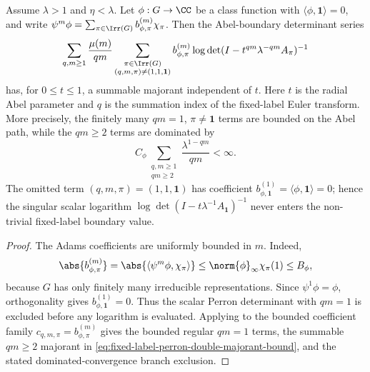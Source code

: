 \begin{lemma}
  \label{lem:fixed-label-perron-double-majorant}
  Assume \(\lambda>1\) and \(\eta<\lambda\). Let
  \(\phi:G\to\CC\) be a class function with
  \(\langle\phi,\mathbf1\rangle=0\), and write
  \(\psi^m\phi=\sum_{\pi\in\Irr(G)}b_{\phi,\pi}^{(m)}\chi_\pi\).
  Then the Abel-boundary determinant series
  \begin{equation}\label{eq:fixed-label-perron-double-majorant-series}
    \sum_{q,m\ge1}\frac{\mu(m)}{qm}
      \sum_{\substack{\pi\in\Irr(G)\\(q,m,\pi)\neq(1,1,\mathbf1)}}
        b_{\phi,\pi}^{(m)}
        \log\det(I-t^{qm}\lambda^{-qm}A_\pi)^{-1}
  \end{equation}
  has, for \(0\le t\le1\), a summable majorant independent of \(t\).
  Here \(t\) is the radial Abel parameter and \(q\) is the summation index
  of the fixed-label Euler transform. More precisely, the finitely many
  \(qm=1\), \(\pi\neq\mathbf1\) terms are bounded on the Abel path, while
  the \(qm\ge2\) terms are dominated by
  \begin{equation}\label{eq:fixed-label-perron-double-majorant-bound}
    C_\phi
    \sum_{\substack{q,m\ge1\\qm\ge2}}\frac{\lambda^{1-qm}}{qm}<\infty .
  \end{equation}
  The omitted term \((q,m,\pi)=(1,1,\mathbf1)\) has coefficient
  \(b_{\phi,\mathbf1}^{(1)}=\langle\phi,\mathbf1\rangle=0\); hence the
  singular scalar logarithm
  \(\log\det(I-t\lambda^{-1}A_{\mathbf1})^{-1}\) never enters the
  non-trivial fixed-label boundary value.
\end{lemma}

\begin{proof}
  The Adams coefficients are uniformly bounded in \(m\). Indeed,
  \[
    \abs{b_{\phi,\pi}^{(m)}}
    =\abs{\langle\psi^m\phi,\chi_\pi\rangle}
    \le \norm{\phi}_\infty\chi_\pi(1)
    \le B_\phi,
  \]
  because \(G\) has only finitely many irreducible representations. Since
  \(\psi^1\phi=\phi\), orthogonality gives
  \(b_{\phi,\mathbf1}^{(1)}=0\). Thus the scalar Perron determinant with
  \(qm=1\) is excluded before any logarithm is evaluated. Applying
   to the bounded
  coefficient family \(c_{q,m,
  \pi}=b_{\phi,\pi}^{(m)}\) gives the bounded regular \(qm=1\) terms, the
  summable \(qm\ge2\) majorant in
  \eqref{eq:fixed-label-perron-double-majorant-bound}, and the stated
  dominated-convergence branch exclusion.
\end{proof}

